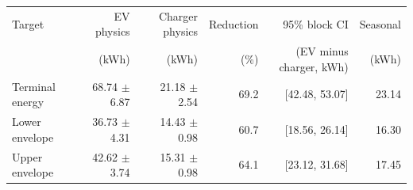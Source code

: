 \begin{tabular}{lrrrrr}
\toprule
Target & EV physics & Charger physics & Reduction & 95\% block CI & Seasonal \\
 & (kWh) & (kWh) & (\%) & (EV minus charger, kWh) & (kWh) \\
\midrule
Terminal energy & 68.74 $\pm$ 6.87 & 21.18 $\pm$ 2.54 & 69.2 & [42.48, 53.07] & 23.14 \\
Lower envelope & 36.73 $\pm$ 4.31 & 14.43 $\pm$ 0.98 & 60.7 & [18.56, 26.14] & 16.30 \\
Upper envelope & 42.62 $\pm$ 3.74 & 15.31 $\pm$ 0.98 & 64.1 & [23.12, 31.68] & 17.45 \\
\bottomrule
\end{tabular}
